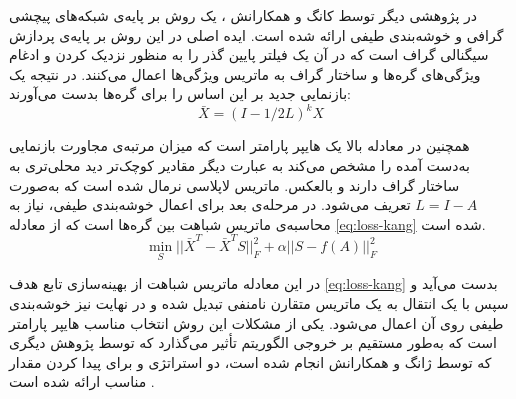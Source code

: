 در پژوهشی دیگر توسط کانگ و همکارانش\cite{fine} ، یک روش بر پایه‌ی شبکه‌های پیچشی گرافی و خوشه‌بندی طیفی ارائه شده است. ایده اصلی در این روش بر پایه‌ی پردازش سیگنالی گراف است که در آن یک فیلتر پایین گذر  را به منظور نزدیک کردن و ادغام ویژگی‌های گره‌ها و ساختار گراف به ماتریس ویژگی‌ها اعمال می‌کنند. در نتیجه یک بازنمایی جدید بر این اساس را برای گره‌ها بدست می‌آورند:
\vspace{-6mm}
\begin{equation}
\bar{X}=(I-1/2 L)^k X   
\end{equation}

\vspace{-6mm}
همچنین در معادله بالا  یک هایپر پارامتر است که میزان مرتبه‌ی مجاورت بازنمایی به‌دست آمده را مشخص می‌کند به عبارت دیگر مقادیر کوچک‌تر  دید محلی‌تری به ساختار گراف دارند و بالعکس.   ماتریس لاپلاسی نرمال شده است که به‌صورت $L = I - A$ تعریف می‌شود.
 در مرحله‌ی بعد برای اعمال خوشه‌بندی طیفی، نیاز به محاسبه‌ی ماتریس شباهت بین گره‌ها است که از معادله \ref{eq:loss-kang} شده است.
\vspace{-10mm}
\begin{equation}
\min_S||\bar{X} ^T- \bar{X} ^T S||_F^2+α||S-f(A)||_F^2
\label{eq:loss-kang}    
\end{equation}

\vspace{-6mm}
در این معادله ماتریس شباهت  از بهینه‌سازی تابع هدف \ref{eq:loss-kang} بدست می‌آید و سپس با یک انتقال به یک ماتریس متقارن نامنفی تبدیل شده و در نهایت نیز خوشه‌بندی طیفی روی آن اعمال می‌شود. یکی از مشکلات این روش انتخاب مناسب هایپر پارامتر  است که به‌طور مستقیم بر خروجی الگوریتم تأثیر می‌گذارد که توسط پژوهش دیگری که توسط ژانگ و همکارانش انجام شده‌ است، دو استراتژی  و  برای پیدا کردن مقدار مناسب  ارائه شده است \cite{fine}.
\\

